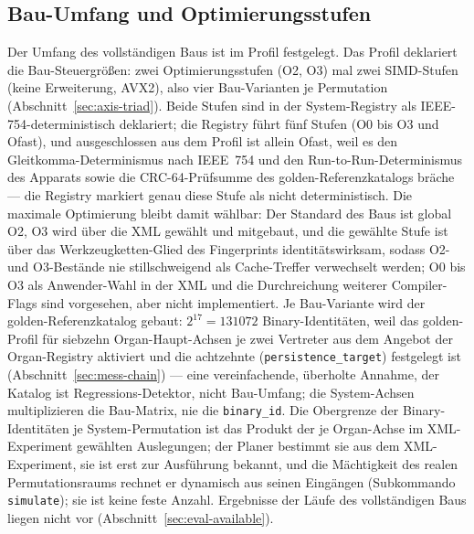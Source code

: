 \begin{nurlang}
\subsection{Bau-Umfang und Optimierungsstufen}\label{sec:eval-build-scope}
Der Umfang des vollständigen Baus ist im Profil festgelegt. Das Profil deklariert die
Bau-Steuergrößen: zwei Optimierungsstufen (O2, O3) mal zwei SIMD-Stufen (keine Erweiterung, AVX2), also
vier Bau-Varianten je Permutation (Abschnitt~\ref{sec:axis-triad}). Beide Stufen sind in der
System-Registry als IEEE-754-deterministisch deklariert; die Registry führt fünf Stufen (O0 bis O3 und
Ofast), und ausgeschlossen aus dem Profil ist allein Ofast, weil es den Gleitkomma-Determinismus nach
IEEE~754 und den Run-to-Run-Determinismus des Apparats sowie die CRC-64-Prüfsumme des golden-Referenzkatalogs
bräche --- die Registry markiert genau diese Stufe als nicht deterministisch. Die maximale
Optimierung bleibt damit wählbar: Der Standard des Baus ist global O2, O3 wird über die XML gewählt und
mitgebaut, und die gewählte Stufe ist über das Werkzeugketten-Glied des Fingerprints
identitätswirksam, sodass O2- und O3-Bestände nie stillschweigend als Cache-Treffer verwechselt
werden; O0 bis O3 als Anwender-Wahl in der XML und die Durchreichung weiterer Compiler-Flags sind
vorgesehen, aber nicht implementiert. Je Bau-Variante wird der golden-Referenzkatalog
gebaut: $2^{17} = 131072$ Binary-Identitäten, weil das golden-Profil für siebzehn Organ-Haupt-Achsen
je zwei Vertreter aus dem Angebot der Organ-Registry aktiviert und die achtzehnte
(\texttt{persistence\_target}) festgelegt ist (Abschnitt~\ref{sec:mess-chain}) --- eine vereinfachende,
überholte Annahme, der Katalog ist Regressions-Detektor, nicht Bau-Umfang; die System-Achsen multiplizieren
die Bau-Matrix, nie die \texttt{binary\_id}. Die Obergrenze der Binary-Identitäten je System-Permutation ist
das Produkt der je Organ-Achse im XML-Experiment gewählten Auslegungen; der Planer bestimmt sie aus dem
XML-Experiment, sie ist erst zur Ausführung bekannt, und die Mächtigkeit des realen Permutationsraums
rechnet er dynamisch aus seinen Eingängen (Subkommando \texttt{simulate}); sie ist keine feste Anzahl. Ergebnisse der
Läufe des vollständigen Baus liegen nicht vor (Abschnitt~\ref{sec:eval-available}).
\end{nurlang}
